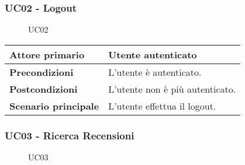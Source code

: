         \subsubsection{UC02 - Logout}
        \label{UC02}

            \begin{figure}[H]
                \centering
                
                \caption{UC02}
            \end{figure}

            \begin{center}
                \renewcommand{\arraystretch}{1.5}
                \begin{tabular}{m{10em} m{20em}}
                    \hline
                    \textbf{Attore primario} & Utente autenticato \\
                    \hline
                    \textbf{Precondizioni} & L'utente è autenticato. \\
                    \hline
                    \textbf{Postcondizioni} & L'utente non è più autenticato. \\
                    \hline
                    \textbf{Scenario principale} & L'utente effettua il logout. \\
                    \hline
                \end{tabular}
            \end{center}

        \subsubsection{UC03 - Ricerca Recensioni}
        \label{UC03}

            \begin{figure}[H]
                \centering
                
                \caption{UC03}
            \end{figure}

